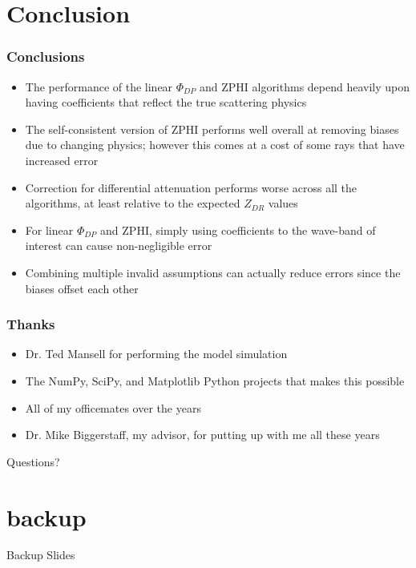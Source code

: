 \documentclass[red]{beamer}
\begin{document}
\section{Conclusion}
\begin{frame}[<+->]
	\frametitle{Conclusions}
	\begin{itemize}
		\item The performance of the linear $\Phi_{DP}$ and ZPHI algorithms depend heavily upon having coefficients
		that reflect the true scattering physics
		\item The self-consistent version of ZPHI performs well overall at removing biases due to changing physics; however this comes
		at a cost of some rays that have increased error
		\item Correction for differential attenuation performs worse across all the algorithms, at least relative to the expected $Z_{DR}$ values
		\item For linear $\Phi_{DP}$ and ZPHI, simply using coefficients to the wave-band of interest can cause non-negligible error
		\item Combining multiple invalid assumptions can actually reduce errors since the biases offset each other
	\end{itemize}
\end{frame}

\begin{frame}
	\frametitle{Thanks}
	\begin{itemize}
		\item Dr. Ted Mansell for performing the model simulation
		\item The NumPy, SciPy, and Matplotlib Python projects that makes this possible
		\item All of my officemates over the years
		\item Dr. Mike Biggerstaff, my advisor, for putting up with me all these years
	\end{itemize}
	\begin{center}
		\large{Questions?}
	\end{center}
\end{frame}

\section{backup}
\begin{frame}
	\begin{center}
		Backup Slides
	\end{center}
\end{frame}
\end{document}
